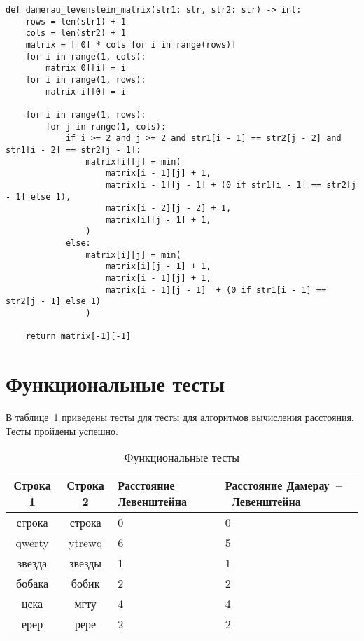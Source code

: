 \begin{center}
    \captionsetup{justification=raggedright,singlelinecheck=off}
    \begin{lstlisting}[label=lst:dam_lev_matrix,caption=Матричный алгоритм поиска расстояния Дамерау~--~Левенштейна]
def damerau_levenstein_matrix(str1: str, str2: str) -> int:
	rows = len(str1) + 1
	cols = len(str2) + 1
	matrix = [[0] * cols for i in range(rows)]
	for i in range(1, cols):
		matrix[0][i] = i
	for i in range(1, rows):
		matrix[i][0] = i

	for i in range(1, rows):
		for j in range(1, cols):
			if i >= 2 and j >= 2 and str1[i - 1] == str2[j - 2] and str1[i - 2] == str2[j - 1]:
				matrix[i][j] = min(
					matrix[i - 1][j] + 1,
					matrix[i - 1][j - 1] + (0 if str1[i - 1] == str2[j - 1] else 1),
					matrix[i - 2][j - 2] + 1,
					matrix[i][j - 1] + 1,
				)
			else:
				matrix[i][j] = min(
					matrix[i][j - 1] + 1, 
					matrix[i - 1][j] + 1, 
					matrix[i - 1][j - 1]  + (0 if str1[i - 1] == str2[j - 1] else 1)
				)

	return matrix[-1][-1]
\end{lstlisting}
\end{center}


\section{Функциональные тесты}

В таблице~\ref{tbl:functional_test} приведены тесты для тесты для алгоритмов вычисления расстояния. Тесты пройдены успешно.

\begin{center}
    \captionsetup{justification=raggedright,singlelinecheck=off}
    \begin{longtable}[c]{|c|c|p{3cm}|p{3cm}|}
    \caption{Функциональные тесты\label{tbl:functional_test}} \\ \hline
		Строка 1 & Строка 2 & Расстояние Левенштейна & Расстояние Дамерау~--~Левенштейна \\ \hline
		строка & строка & 0 & 0 \\ \hline
		qwerty & ytrewq & 6 & 5 \\ \hline
		звезда & звезды & 1 & 1 \\ \hline
		бобака & бобик & 2 & 2 \\ \hline
		цска & мгту & 4 & 4 \\ \hline
		ерер & рере & 2 & 2 \\ \hline
	\end{longtable}
\end{center}
